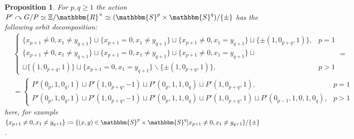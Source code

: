 \documentclass{article}
\newcommand{\assign}{:=}
\numberwithin{definition}{section}
\numberwithin{lemma}{section}
\newtheorem{proposition}{Proposition}
\numberwithin{proposition}{section}
{\theorembodyfont{\rmfamily}\newtheorem{remark}{Remark}
\numberwithin{remark}{section}
}
\begin{document}
\begin{proposition}
  \label{doublePGP:prop-orbitdeco}For $p, q \geqslant 1$ the action $P'
  \curvearrowright G / P \simeq \Xi /\mathbbm{R}^{\times} \simeq (
  \mathbbm{S}^p \times \mathbbm{S}^q) / \{ \pm \}$ has the following orbit
  decomposition:
  \begin{eqnarray}
    & \left\{ \begin{array}{ll}
      \{ x_{p + 1} \neq 0, x_1 \neq y_{q + 1} \} \sqcup \{ x_{p + 1} = 0, x_1
      \neq y_{q + 1} \} \sqcup \{ x_{p + 1} \neq 0, x_1 = y_{q + 1} \} \sqcup
      \{ \pm ( 1, 0_{p + q}, 1) \}, & p = 1\\
      \{ x_{p + 1} \neq 0, x_1 \neq y_{q + 1} \} \sqcup \{ x_{p + 1} = 0, x_1
      \neq y_{q + 1} \} \sqcup \{ x_{p + 1} \neq 0, x_1 = y_{q + 1} \} \sqcup
      & \\
      \sqcup \{ ( 1, 0_{p + q}, 1) \} \sqcup \{ x_{p + 1} = 0, x_1 = y_{q + 1}
      \} \backslash \{ \pm ( 1, 0_{p + q}, 1) \}, & p > 1
    \end{array} \right. = &  \nonumber\\
    & = \left\{ \begin{array}{ll}
      P' ( 0_p, 1, 0_q, 1) \sqcup P' ( 1, 0_{p + q}, - 1) \sqcup P' ( 0_p, 1,
      1, 0_q) \sqcup P' ( 1, 0_{p + q}, 1), & p = 1\\
      P' ( 0_p, 1, 0_q, 1) \sqcup P' ( 1, 0_{p + q}, - 1) \sqcup P' ( 0_p, 1,
      1, 0_q) \sqcup P' ( 1, 0_{p + q}, 1) \sqcup P' ( 0_{p - 1}, 1, 0, 1,
      0_q), & p > 1
    \end{array} \right. &  \nonumber
  \end{eqnarray}
  here, for example $\{ x_{p + 1} \neq 0, x_1 \neq y_{q + 1} \} \assign \{ (
  x, y) \in \mathbbm{S}^p \times \mathbbm{S}^q | x_{p + 1} \neq 0, x_1 \neq
  y_{q + 1} \} / \{ \pm \}$.
\end{proposition}
\end{document}
